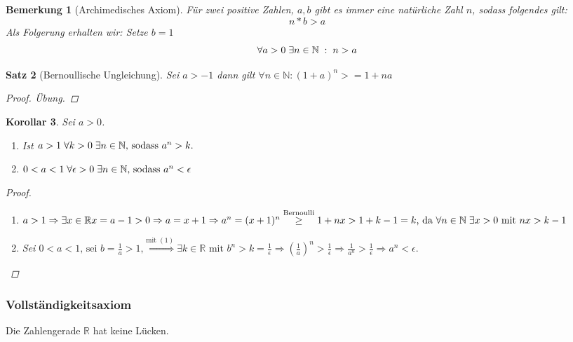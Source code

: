 \documentclass[a4paper,titlepage,oneside]{article}
\def\N{\ensuremath{\mathbb{N}} }
\def\R{\ensuremath{\mathbb{R}} }
\newcommand{\fa}[1]{\ensuremath{\forall#1}}
\newcommand{\fain}[2]{\ensuremath{\forall#1\in#2}}
\newcommand{\ex}[1]{\ensuremath{\exists#1}}
\def\sp{\hspace{0,1cm}}
\theoremstyle{thmstyle}
\newtheorem{satz}{Satz}[subsection]
\newtheorem{korr}[satz]{Korollar}
\newtheorem{bem}[satz]{Bemerkung}
\begin{document}
\begin{bem}[Archimedisches Axiom]
Für zwei positive Zahlen, $a, b$ gibt es immer eine natürliche Zahl $n$, sodass folgendes gilt:
\[n * b > a\]
Als Folgerung erhalten wir: Setze $b = 1$
\[\fa a > 0 \sp \ex n \in \N \sp:\sp n > a\]
\end{bem}

\begin{satz}[Bernoullische Ungleichung]
Sei $a > -1$ dann gilt $\fain{n}{\N} : (1+a)^n >= 1 + na$
\begin{proof}
Übung.  %
\end{proof}
\end{satz}

\begin{korr}
Sei $a > 0$. 
\begin{enumerate}[label=(\arabic*)]
\item Ist \(a > 1 \sp \forall k > 0 \sp \exists n \in \N \text{, sodass }a^n > k.\)
\item \(0 < a < 1 \sp \forall \epsilon > 0 \sp \exists n \in \N \text{, sodass }a^n < \epsilon\)
\end{enumerate}
\begin{proof}
\sp
\begin{enumerate}[label=(\arabic*)]
\item \( a > 1 \Rightarrow \exists x \in \R x = a - 1 > 0 \Rightarrow a = x +1 \Rightarrow a^n = (x + 1)^n \overset{\text{Bernoulli}}{\ge}1 + nx  > 1 + k -1 = k \text{, da }\forall n \in \N \sp \exists x > 0 \text{ mit } nx > k - 1\)
\item Sei \( 0 < a < 1 \text{, sei } b = \frac{1}{a} > 1\text{,} \overset{\text{mit }(1)}{\Rightarrow} \exists k \in \R \text{ mit } b^n > k = \frac{1}{\epsilon} \Rightarrow 
\left(\frac{1}{a}\right)^n > \frac{1}{\epsilon} \Rightarrow  \frac{1}{a^n} > \frac{1}{\epsilon} \Rightarrow a^n < \epsilon.\)
\end{enumerate}
\end{proof}
\end{korr}

\subsubsection{Vollständigkeitsaxiom}
Die Zahlengerade \R hat keine Lücken. 
\end{document}
